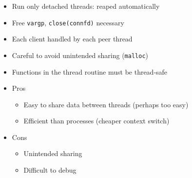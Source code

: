 \documentclass[12pt]{article}
\begin{document}
{\begin{itemize}
\begin{itemize}
		\item Run only detached threads: reaped automatically
		\item Free \texttt{vargp}, \texttt{close(connfd)} necessary
		\item Each client handled by each peer thread
		\item Careful to avoid unintended sharing (\texttt{malloc})
		\item Functions in the thread routine must be thread-safe
		\item Pros
		\begin{itemize}
			\item Easy to share data between threads (perhaps too easy)
			\item Efficient than processes (cheaper context switch)
		\end{itemize}
		\item Cons
		\begin{itemize}
			\item Unintended sharing
			\item Difficult to debug
		\end{itemize}
	\end{itemize}
\end{itemize}
\pagebreak

}
\end{document}

